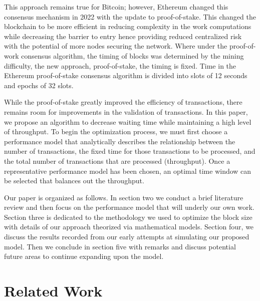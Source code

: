 \documentclass[conference]{IEEEtran}
\begin{document}
This approach remains true for Bitcoin; however, Ethereum changed this consensus 
mechanism in 2022 with the update to proof-of-stake\cite{2022_Ethereum_PoS}. This 
changed the blockchain to be more efficient in reducing complexity in the work 
computations while decreasing the barrier to entry hence providing reduced centralized 
risk with the potential of more nodes securing the network. Where under the proof-of-work
consensus algorithm, the timing of blocks was determined by the mining difficulty, the 
new approach, proof-of-stake, the timing is fixed. Time in the Ethereum proof-of-stake 
consensus algorithm is divided into slots of 12 seconds and epochs of 32 slots.

While the proof-of-stake greatly improved the efficiency of transactions, there remains 
room for improvements in the validation of transactions. In this paper, we propose an 
algorithm to decrease waiting time while maintaining a high level of throughput. To begin 
the optimization process, we must first choose a performance model that analytically 
describes the relationship between the number of transactions, the fixed time for those 
transactions to be processed, and the total number of transactions that are processed 
(throughput). Once a representative performance model has been chosen, an optimal
time window can be selected that balances out the throughput. 

Our paper is organized as follows. In section two we conduct a brief literature review and 
then focus on the performance model that will underly our own work. Section three is 
dedicated to the methodology we used to optimize the block size with details of our 
approach theorized via mathematical models. Section four, we discuss the results recorded 
from our early attempts at simulating our proposed model. Then we conclude in section five 
with remarks and discuss potential future areas to continue expanding upon the model. 

\section{Related Work}\label{related}
\end{document}
